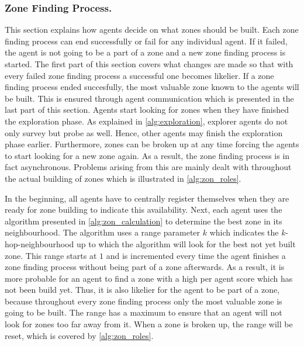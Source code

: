 \subsubsection{Zone Finding Process.}\label{alg:zon_finding}
This section explains how agents decide on what zones should be built. Each zone finding process can end successfully or fail for any individual agent. If it failed, the agent is not going to be a part of a zone and a new zone finding process is started. The first part of this section covers what changes are made so that with every failed zone finding process a successful one becomes likelier. If a zone finding process ended succesfully, the most valuable zone known to the agents will be built. This is ensured through agent communication which is presented in the last part of this section.
Agents start looking for zones when they have finished the exploration phase. As explained in \autoref{alg:exploration}, explorer agents do not only survey but probe as well. Hence, other agents may finish the exploration phase earlier. Furthermore, zones can be broken up at any time forcing the agents to start looking for a new zone again. As a result, the zone finding process is in fact asynchronous. Problems arising from this are mainly dealt with throughout the actual building of zones which is illustrated in \autoref{alg:zon_roles}.

In the beginning, all agents have to centrally register themselves when they are ready for zone building to indicate this availability. Next, each agent uses the algorithm presented in \autoref{alg:zon_calculation} to determine the best zone in its neighbourhood. The algorithm uses a range parameter $k$ which indicates the $k$-hop-neighbourhood up to which the algorithm will look for the best not yet built zone. This range starts at $1$ and is incremented every time the agent finishes a zone finding process without being part of a zone afterwards. As a result, it is more probable for an agent to find a zone with a high per agent score which has not been build yet. Thus, it is also likelier for the agent to be part of a zone, because throughout every zone finding process only the most valuable zone is going to be built. The range has a maximum to ensure that an agent will not look for zones too far away from it. When a zone is broken up, the range will be reset, which is covered by \autoref{alg:zon_roles}.

